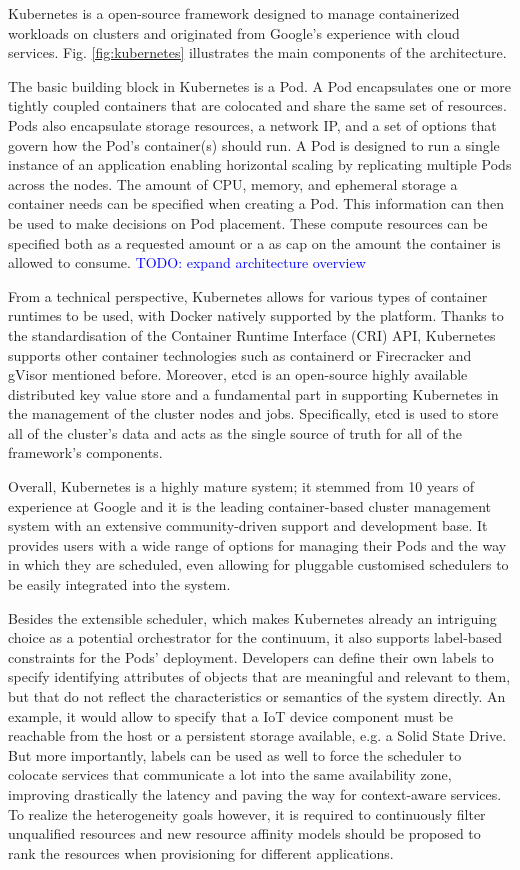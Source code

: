 Kubernetes \cite{kubernetes} is a open-source framework designed to manage containerized workloads on clusters and originated from Google's experience with cloud services. Fig. \ref{fig:kubernetes} illustrates the main components of the architecture.

The basic building block in Kubernetes is a Pod. A Pod encapsulates one or more tightly coupled containers that are colocated and share the same set of resources. Pods also encapsulate storage resources, a network IP, and a set of options that govern how the Pod's container(s) should run. A Pod is designed to run a single instance of an application enabling horizontal scaling by replicating multiple Pods across the nodes. The amount of CPU, memory, and ephemeral storage a container needs can be specified when creating a Pod. This information can then be used to make decisions on Pod placement. These compute resources can be specified both as a requested amount or a as cap on the amount the container is allowed to consume. \textcolor{blue}{TODO: expand architecture overview}

From a technical perspective, Kubernetes allows for various types of container runtimes to be used, with Docker natively supported by the platform. Thanks to the standardisation of the Container Runtime Interface (CRI) API, Kubernetes supports other container technologies such as containerd \cite{containerd} or Firecracker and gVisor mentioned before. Moreover, etcd \cite{etcd} is an open-source highly available distributed key value store and a fundamental part in supporting Kubernetes in the management of the cluster nodes and jobs. Specifically, etcd is used to store all of the cluster's data and acts as the single source of truth for all of the framework's components.

Overall, Kubernetes is a highly mature system; it stemmed from 10 years of experience at Google and it is the leading container-based cluster management system with an extensive community-driven support and development base. It provides users with a wide range of options for managing their Pods and the way in which they are scheduled, even allowing for pluggable customised schedulers to be easily integrated into the system.

Besides the extensible scheduler, which makes Kubernetes already an intriguing choice as a potential orchestrator for the continuum, it also supports label-based constraints for the Pods' deployment. Developers can define their own labels to specify identifying attributes of objects that are meaningful and relevant to them, but that do not reflect the characteristics or semantics of the system directly. An example, it would allow to specify that a IoT device component must be reachable from the host or a persistent storage available, e.g. a Solid State Drive. But more importantly, labels can be used as well to force the scheduler to colocate services that communicate a lot into the same availability zone, improving drastically the latency and paving the way for context-aware services. To realize the heterogeneity goals however, it is required to continuously filter unqualified resources and new resource affinity models should be proposed to rank the resources when provisioning for different applications. 

